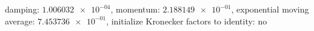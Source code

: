 damping: $\num[scientific-notation=true]{1.006032e-04}$, momentum: $\num[scientific-notation=true]{2.188149e-01}$, exponential moving average: $\num[scientific-notation=true]{7.453736e-01}$, initialize Kronecker factors to identity: $\text{no}$